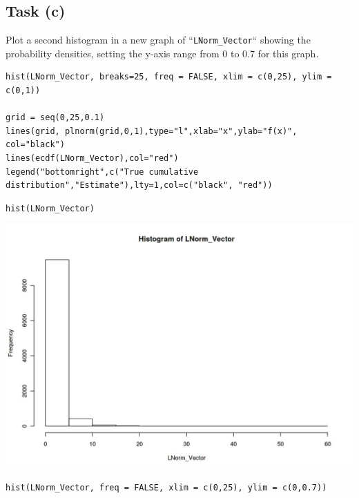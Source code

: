 \documentclass[a4paper,12pt]{article}
\begin{document}
\newpage 
\subsection*{Task (c)}

Plot a second histogram in a new graph of ``\texttt{LNorm\_Vector}`` showing the probability densities, setting the y-axis range from 0 to 0.7 for this graph.


\begin{framed} \begin{verbatim}
hist(LNorm_Vector, breaks=25, freq = FALSE, xlim = c(0,25), ylim = c(0,1))

grid = seq(0,25,0.1)
lines(grid, plnorm(grid,0,1),type="l",xlab="x",ylab="f(x)", col="black")
lines(ecdf(LNorm_Vector),col="red")
legend("bottomright",c("True cumulative distribution","Estimate"),lty=1,col=c("black", "red"))
\end{verbatim}\end{framed}




\begin{framed} \begin{verbatim}
hist(LNorm_Vector)
\end{verbatim}\end{framed}


\includegraphics[scale=0.4]{00-A2/images/output_24_0.jpeg}




\begin{framed} \begin{verbatim}
hist(LNorm_Vector, freq = FALSE, xlim = c(0,25), ylim = c(0,0.7))
\end{verbatim}\end{framed}
\end{document}
